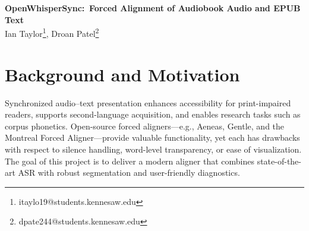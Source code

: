 \documentclass[12pt]{article}
\begin{document}
\begin{center}
  {\LARGE\bfseries OpenWhisperSync:\, Forced Alignment of Audiobook Audio and EPUB Text}\\[1em]
  {\large Ian Taylor\footnote{itaylo19@students.kennesaw.edu},
          Droan Patel\footnote{dpate244@students.kennesaw.edu}}\\[2em]
\end{center}

\begin{abstract}
OpenWhisperSync is a command-line application that aligns audiobook chapters
with their corresponding EPUB text.
The system integrates the OpenAI Whisper automatic speech-recognition model,
librosa-based silence detection, and rapidfuzz fuzzy matching inside a hybrid
pipeline that yields word-level timestamps and probabilistic confidence scores.
Experiments on Mary Shelley’s \emph{Frankenstein} demonstrate a 92 \% sentence-level
alignment accuracy while processing audio at approximately 1.7 × real time on
a MacBook M1 Pro.
Compared with established aligners such as Aeneas and Gentle, OpenWhisperSync
offers finer-grained boundary detection, richer visual diagnostics, and a GUI
prototype for interactive exploration.
\end{abstract}

\section{Background and Motivation}
Synchronized audio–text presentation enhances accessibility for
print-impaired readers, supports second-language acquisition, and enables
research tasks such as corpus phonetics.
Open-source forced aligners—e.g., Aeneas, Gentle, and the Montreal Forced
Aligner—provide valuable functionality, yet each has drawbacks with respect to
silence handling, word-level transparency, or ease of visualization.
The goal of this project is to deliver a modern aligner that combines
state-of-the-art ASR with robust segmentation and user-friendly diagnostics.
\end{document}
